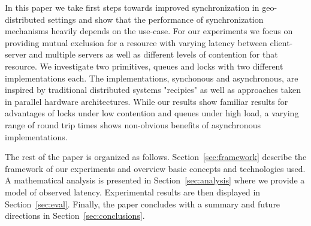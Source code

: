 In this paper we take first steps towards improved synchronization in geo-distributed settings and show that the performance of synchronization mechanisms heavily depends on the use-case. For our experiments we focus on providing mutual exclusion for a resource with varying latency between client-server and multiple servers as well as different levels of contention for that resource. We investigate two primitives, queues and locks with two different implementations each. The implementations, synchonous and asynchronous, are inspired by traditional distributed systems "recipies" as well as approaches taken in parallel hardware architectures. While our results show familiar results for advantages of locks under low contention and queues under high load, a varying range of round trip times shows non-obvious benefits of asynchronous implementations.

The rest of the paper is organized as follows. Section~\ref{sec:framework} describe the framework of our experiments and overview basic concepts and technologies used. A mathematical analysis is presented in Section~\ref{sec:analysis} where we provide a model of observed latency. Experimental results are then displayed in Section~\ref{sec:eval}. Finally, the paper concludes with a summary and future directions in Section~\ref{sec:conclusions}.